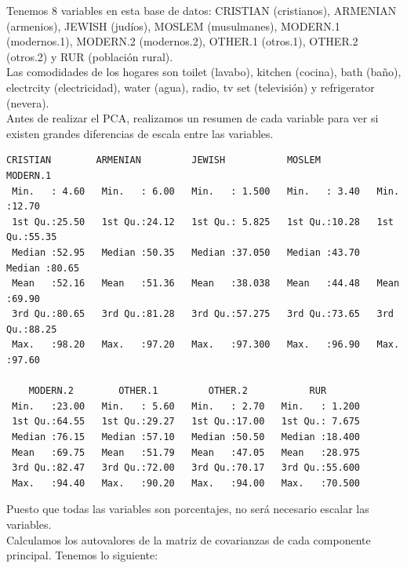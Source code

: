 \documentclass[12pt,a4paper,twoside,openright,titlepage,final]{article}
\begin{document}
Tenemos 8 variables en esta base de datos: CRISTIAN (cristianos), ARMENIAN (armenios), JEWISH (judíos), MOSLEM (musulmanes), MODERN.1 (modernos.1), MODERN.2 (modernos.2), OTHER.1 (otros.1), OTHER.2 (otros.2) y RUR (población rural).\\

Las comodidades de los hogares son toilet (lavabo), kitchen (cocina), bath (baño),  electrcity (electricidad), water (agua), radio, tv set (televisión) y refrigerator (nevera).\\

Antes de realizar el PCA, realizamos un resumen de cada variable para ver si existen grandes diferencias de escala entre las variables.

\begin{Verbatim}[fontsize=\scriptsize]
   CRISTIAN        ARMENIAN         JEWISH           MOSLEM         MODERN.1       
 Min.   : 4.60   Min.   : 6.00   Min.   : 1.500   Min.   : 3.40   Min.   :12.70  
 1st Qu.:25.50   1st Qu.:24.12   1st Qu.: 5.825   1st Qu.:10.28   1st Qu.:55.35   
 Median :52.95   Median :50.35   Median :37.050   Median :43.70   Median :80.65   
 Mean   :52.16   Mean   :51.36   Mean   :38.038   Mean   :44.48   Mean   :69.90   
 3rd Qu.:80.65   3rd Qu.:81.28   3rd Qu.:57.275   3rd Qu.:73.65   3rd Qu.:88.25   
 Max.   :98.20   Max.   :97.20   Max.   :97.300   Max.   :96.90   Max.   :97.60  
 
    MODERN.2        OTHER.1         OTHER.2           RUR        
 Min.   :23.00   Min.   : 5.60   Min.   : 2.70   Min.   : 1.200  
 1st Qu.:64.55   1st Qu.:29.27   1st Qu.:17.00   1st Qu.: 7.675  
 Median :76.15   Median :57.10   Median :50.50   Median :18.400  
 Mean   :69.75   Mean   :51.79   Mean   :47.05   Mean   :28.975  
 3rd Qu.:82.47   3rd Qu.:72.00   3rd Qu.:70.17   3rd Qu.:55.600  
 Max.   :94.40   Max.   :90.20   Max.   :94.00   Max.   :70.500  
\end{Verbatim}

Puesto que todas las variables son porcentajes, no será necesario escalar las variables.\\

Calculamos los autovalores de la matriz de covarianzas de cada componente principal. Tenemos lo siguiente:
\end{document}
